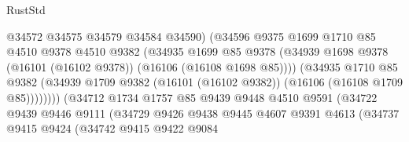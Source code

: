 \begin{lexlean}{RustStd}
\begin{coremodule}
                                      @34572
                                      @34575
                                      @34579
                                      @34584
                                      @34590)
                                    (@34596
                                      @9375
                                      @1699
                                      @1710
                                      @85
                                      @4510
                                      @9378
                                      @4510
                                      @9382
                                      (@34935
                                        @1699
                                        @85
                                        @9378
                                        (@34939
                                          @1698
                                          @9378
                                          (@16101 (@16102 @9378))
                                          (@16106 (@16108 @1698 @85))))
                                      (@34935
                                        @1710
                                        @85
                                        @9382
                                        (@34939
                                          @1709
                                          @9382
                                          (@16101 (@16102 @9382))
                                          (@16106 (@16108 @1709 @85))))))))
                              (@34712
                                @1734
                                @1757
                                @85
                                @9439
                                @9448
                                @4510
                                @9591
                                (@34722
                                  @9439
                                  @9446
                                  @9111
                                  (@34729
                                    @9426
                                    @9438
                                    @9445
                                    @4607
                                    @9391
                                    @4613
                                    (@34737
                                      @9415
                                      @9424
                                      (@34742
                                        @9415
                                        @9422
                                        @9084

\end{coremodule}
\end{lexlean}
